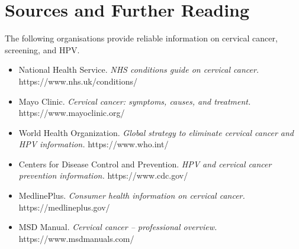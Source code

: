 \section*{Sources and Further Reading}
The following organisations provide reliable information on cervical cancer, screening, and HPV.

\begin{itemize}
    \item National Health Service. \textit{NHS conditions guide on cervical cancer.} https://www.nhs.uk/conditions/
    \item Mayo Clinic. \textit{Cervical cancer: symptoms, causes, and treatment.} https://www.mayoclinic.org/
    \item World Health Organization. \textit{Global strategy to eliminate cervical cancer and HPV information.} https://www.who.int/
    \item Centers for Disease Control and Prevention. \textit{HPV and cervical cancer prevention information.} https://www.cdc.gov/
    \item MedlinePlus. \textit{Consumer health information on cervical cancer.} https://medlineplus.gov/
    \item MSD Manual. \textit{Cervical cancer -- professional overview.} https://www.msdmanuals.com/
\end{itemize}
